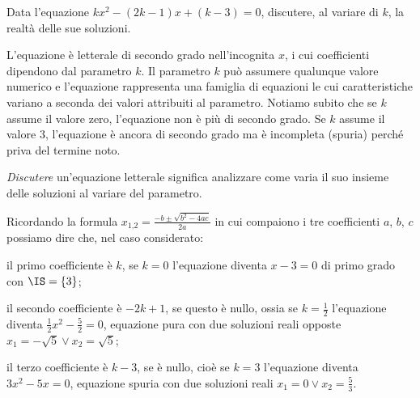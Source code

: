 \begin{exrig}
\begin{esempio}
Data l'equazione $k x^{2} - ( 2 k - 1 ) x + ( k - 3 ) = 0$, discutere, al variare di $k$, la realtà delle sue soluzioni.

L'equazione è letterale di secondo grado nell'incognita $x$, i cui coefficienti dipendono dal parametro $k$. Il parametro $k$ può assumere qualunque valore numerico e l'equazione rappresenta una famiglia di equazioni le cui caratteristiche variano a seconda dei valori attribuiti al parametro. Notiamo subito che se
$k$ assume il valore zero, l'equazione non è più di secondo grado. Se $k$ assume il valore $3$, l'equazione è ancora di secondo grado ma è incompleta (spuria) perché priva del termine noto.

\emph{Discutere} un'equazione letterale significa analizzare come varia il suo insieme delle soluzioni al variare del parametro.

Ricordando la formula $x_{1\text{,}2}=\frac{- b \pm \sqrt{b^{2} - 4 a c}}{2 a}$ in cui compaiono i tre coefficienti $a$, $b$, $c$ possiamo dire che, nel caso considerato:
 \begin{itemize*}
 \item il primo coefficiente è $k$, se $k = 0$ l'equazione diventa $x - 3 = 0$ di primo grado con $\IS = \{3\}$;
 \item il secondo coefficiente è $-2k+1$, se questo è nullo, ossia se $k = \frac{1}{2}$ l'equazione diventa $\frac{1}{2} x^{2} - \frac{5}{2}=0$, equazione pura con due soluzioni reali opposte $x_{1} = - \sqrt{5} \vee x_{2} = \sqrt{5}$;
 \item il terzo coefficiente è $k-3$, se è nullo, cioè se $k = 3$ l'equazione diventa $3 x^{2} - 5 x = 0$, equazione spuria con due soluzioni reali $x_{1} = 0 \vee x_{2} = \frac{5}{3}$.
 \end{itemize*}


\end{esempio}
\end{exrig}
